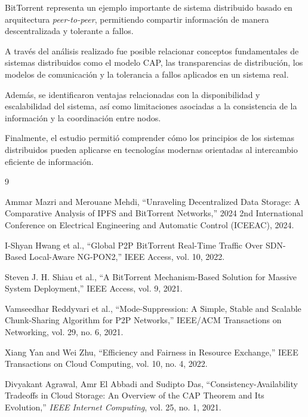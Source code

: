 \documentclass[12pt]{article}
\begin{document}
BitTorrent representa un ejemplo importante de sistema distribuido basado en arquitectura \textit{peer-to-peer}, permitiendo compartir información de manera descentralizada y tolerante a fallos.

A través del análisis realizado fue posible relacionar conceptos fundamentales de sistemas distribuidos como el modelo CAP, las transparencias de distribución, los modelos de comunicación y la tolerancia a fallos aplicados en un sistema real.

Además, se identificaron ventajas relacionadas con la disponibilidad y escalabilidad del sistema, así como limitaciones asociadas a la consistencia de la información y la coordinación entre nodos.

Finalmente, el estudio permitió comprender cómo los principios de los sistemas distribuidos pueden aplicarse en tecnologías modernas orientadas al intercambio eficiente de información.

\newpage

\begin{thebibliography}{9}

Ammar Mazri and Merouane Mehdi,
``Unraveling Decentralized Data Storage: A Comparative Analysis of IPFS and BitTorrent Networks,''
2024 2nd International Conference on Electrical Engineering and Automatic Control (ICEEAC), 2024.

I-Shyan Hwang et al.,
``Global P2P BitTorrent Real-Time Traffic Over SDN-Based Local-Aware NG-PON2,''
IEEE Access, vol. 10, 2022.

Steven J. H. Shiau et al.,
``A BitTorrent Mechanism-Based Solution for Massive System Deployment,''
IEEE Access, vol. 9, 2021.

Vamseedhar Reddyvari et al.,
``Mode-Suppression: A Simple, Stable and Scalable Chunk-Sharing Algorithm for P2P Networks,''
IEEE/ACM Transactions on Networking, vol. 29, no. 6, 2021.

Xiang Yan and Wei Zhu,
``Efficiency and Fairness in Resource Exchange,''
IEEE Transactions on Cloud Computing, vol. 10, no. 4, 2022.

Divyakant Agrawal, Amr El Abbadi and Sudipto Das,
``Consistency-Availability Tradeoffs in Cloud Storage: An Overview of the CAP Theorem and Its Evolution,''
\textit{IEEE Internet Computing}, vol. 25, no. 1, 2021.

\end{thebibliography}
\end{document}

